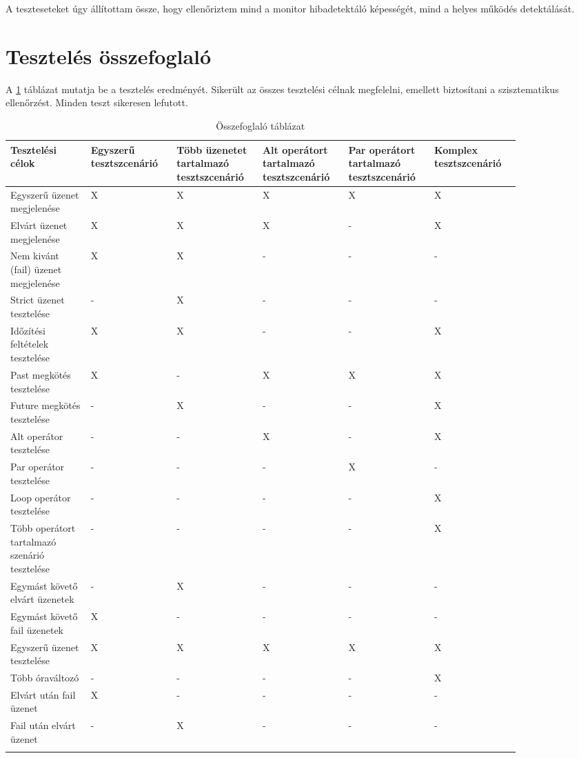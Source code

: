 A teszteseteket úgy állítottam össze, hogy ellenőriztem mind a monitor hibadetektáló képességét, mind a helyes működés detektálását.

\clearpage\section{Tesztelés összefoglaló}

A \ref{tab:table1} táblázat mutatja be a tesztelés eredményét.
Sikerült az összes tesztelési célnak megfelelni, emellett biztosítani a szisztematikus ellenőrzést.
Minden teszt sikeresen lefutott.

\begin{longtable}{|p{0.1428\linewidth}|p{0.1428\linewidth}|p{0.1428\linewidth}|p{0.1428\linewidth}|p{0.1428\linewidth}|p{0.1428\linewidth}|}
\hline
\textbf{Tesztelési célok} & \textbf{Egyszerű tesztszcenárió} & \textbf{Több üzenetet tartalmazó tesztszcenárió} & \textbf{Alt operátort tartalmazó tesztszcenárió} & \textbf{Par operátort tartalmazó tesztszcenárió} & \textbf{Komplex tesztszcenárió}\\
\hline
Egyszerű üzenet megjelenése & X & X & X & X & X\\
\hline
Elvárt üzenet megjelenése & X & X & X & - & X\\
\hline
Nem kivánt (fail) üzenet megjelenése & X & X & - & - & -\\
\hline
Strict üzenet tesztelése & - & X & - & - & -\\
\hline
Időzítési feltételek tesztelése & X & X & - & - & X\\
\hline
Past megkötés tesztelése & X & - & X & X & X\\
\hline
Future megkötés tesztelése & - & X & - & - & X\\
\hline
Alt operátor tesztelése & - & - & X & - & X\\
\hline
Par operátor tesztelése & - & - & - & X & -\\
\hline
Loop operátor tesztelése & - & - & - & - & X\\
\hline
Több operátort tartalmazó szenárió tesztelése & - & - & - & - & X\\
\hline
Egymást követő elvárt üzenetek & - & X & - & - & -\\
\hline
Egymást követő fail üzenetek & X & - & - & - & -\\
\hline
Egyszerű üzenet tesztelése & X & X & X & X & X\\
\hline
Több óraváltozó & - & - & - & - & X\\
\hline
Elvárt után fail üzenet & X & - & - & - & -\\
\hline
Fail után elvárt üzenet & - & X & - & - & -\\
\hline
\caption{Összefoglaló táblázat}
\label{tab:table1}
\end{longtable}
